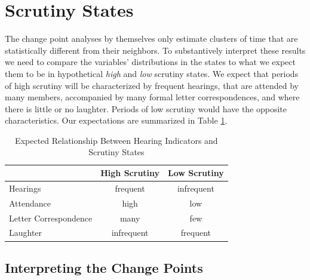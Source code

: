 \documentclass[a4paper]{article}\usepackage[]{graphicx}\usepackage[]{color}
\begin{document}
\section{Scrutiny States}

The change point analyses by themselves only estimate clusters of time that are statistically different from their neighbors. To substantively interpret these results we need to compare the variables' distributions in the states to what we expect them to be in hypothetical \emph{high} and \emph{low} scrutiny states. We expect that periods of high scrutiny will be characterized by frequent hearings, that are attended by many members, accompanied by many formal letter correspondences, and where there is little or no laughter. Periods of low scrutiny would have the opposite characteristics. Our expectations are summarized in Table \ref{ExpectedTable}.

\begin{table}
    \caption{Expected Relationship Between Hearing Indicators and Scrutiny States}
    \label{ExpectedTable}
    \begin{center}
        \begin{tabular}{l | c c}
            \hline
            & High Scrutiny & Low Scrutiny \\
            \hline \hline
            Hearings & frequent & infrequent \\[0.25cm]
            Attendance & high & low \\[0.25cm]
            Letter Correspondence & many & few \\[0.25cm]
            Laughter & infrequent & frequent \\
            \hline
        \end{tabular}
    \end{center}
\end{table}

\subsection{Interpreting the Change Points}
\end{document}
